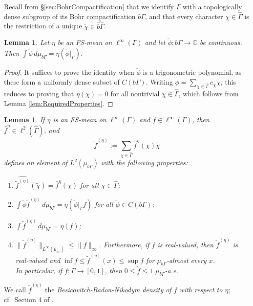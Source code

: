 \documentclass[12pt]{amsart} \usepackage{amsmath,centernot,amssymb,leftindex}
\newtheorem{lemma}[theorem]{Lemma}
\numberwithin{theorem}{section}
\numberwithin{equation}{section}
\theoremstyle{definition}
\begin{document}
Recall from \S\ref{sec:BohrCompactification} that we identify $\Gamma$ with a topologically dense subgroup of its Bohr compactification $b\Gamma$, and that every character $\chi\in \widehat{\Gamma}$ is the restriction of a unique $\tilde{\chi}\in \widehat{b\Gamma}$.

\begin{lemma}\label{lem:CorrectAveragingAndbGamma}
	Let $\eta$ be an FS-mean on $\ell^\infty(\Gamma)$ and let $\tilde{\phi}:b\Gamma\to \mathbb C$ be continuous.  Then $\int \tilde{\phi}\, d\mu_{b\Gamma}=\eta(\tilde{\phi}|_\Gamma)$.
\end{lemma}

\begin{proof}
	It suffices to prove the identity when $\tilde{\phi}$ is a trigonometric polynomial, as these form a uniformly dense subset of $C(b\Gamma)$.  Writing  $\tilde{\phi}=\sum_{\chi\in\widehat{\Gamma}} c_\chi \tilde{\chi}$,  this reduces to proving that $\eta(\chi)=0$ for all nontrivial $\chi\in \widehat{\Gamma}$, which follows from Lemma \ref{lem:RequiredProperties}.
\end{proof}

\begin{lemma}\label{lem:DefBRN}
	If $\eta$ is an FS-mean on $\ell^\infty(\Gamma)$ and $f\in \ell^{\infty}(\Gamma)$, then  $\hat{f}^{\eta}\in \ell^{2}(\widehat{\Gamma})$, and 
	\[
	 \tilde{f}^{(\eta)}:=\sum_{\chi\in \widehat{\Gamma}} \hat{f}^\eta(\chi)\tilde{\chi}
	\] 
	defines an element of $L^{2}(\mu_{b\Gamma})$ with the following properties:
	\begin{enumerate}
		\item\label{item:Coefficients} $\widehat{\tilde{f}^{(\eta)}}(\tilde{\chi})=\hat{f}^{\eta}(\chi)$ for all $\chi\in\widehat{\Gamma}$;
		\item\label{item:ContinuousIntegral}  $\int \tilde{\phi}\tilde{f}^{(\eta)}\, d\mu_{b\Gamma} = \eta(\tilde{\phi}|_{\Gamma} f)$ for all $\tilde{\phi}\in C(b\Gamma)$;
		\item\label{item:Integral} $\int \tilde{f}^{(\eta)}\, d\mu_{b\Gamma}=\eta(f)$;
		\item\label{item:BRNbound} $\|\tilde{f}^{(\eta)}\|_{L^{\infty}(\mu_{b\Gamma})}\leq \|f\|_{\infty}$. 		Furthermore, if $f$ is real-valued, then $\tilde{f}^{(\eta)}$ is real-valued and $\inf f \leq \tilde{f}^{(\eta)}(x) \leq \sup f$ for $\mu_{b\Gamma}$-almost every $x$.\\  In particular, if $f:\Gamma \to [0,1]$, then $0\leq \tilde{f} \leq 1$ $\mu_{b\Gamma}$-a.e.
	\end{enumerate}
\end{lemma}
We call $\tilde{f}^{(\eta)}$ the \emph{Besicovitch-Radon-Nikodym density of $f$ with respect to $\eta$}; cf.~Section 4 of \cite{BjorklundGriesmer_BohrTriple}.
\end{document}
